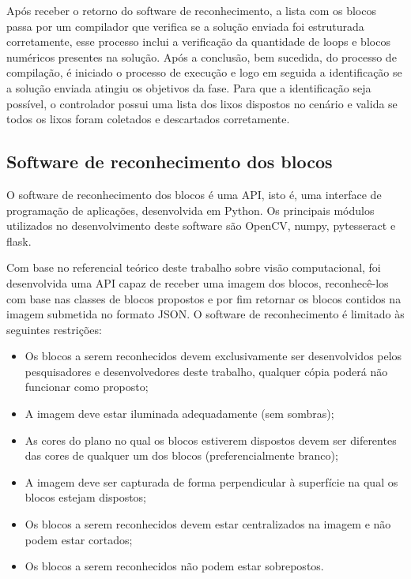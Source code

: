     Após receber o retorno do software de reconhecimento, a lista com os blocos passa por um compilador que verifica se a solução enviada foi estruturada corretamente, esse processo inclui a verificação da quantidade de loops e blocos numéricos presentes na solução. Após a conclusão, bem sucedida, do processo de compilação, é iniciado o processo de execução e logo em seguida a identificação se a solução enviada atingiu os objetivos da fase. Para que a identificação seja possível, o controlador possui uma lista dos lixos dispostos no cenário e valida se todos os lixos foram coletados e descartados corretamente.
    
    
    \subsection{Software de reconhecimento dos blocos}
    
    O software de reconhecimento dos blocos é uma API, isto é, uma interface de programação de aplicações,  desenvolvida em Python. Os principais módulos utilizados no desenvolvimento deste software são OpenCV, numpy, pytesseract e flask.

    Com base no referencial teórico deste trabalho sobre visão computacional, foi desenvolvida uma API capaz de receber uma imagem dos blocos, reconhecê-los com base nas classes de blocos propostos e por fim retornar os blocos contidos na imagem submetida no formato JSON. O software de reconhecimento é limitado às seguintes restrições:
    
        \begin{itemize}
        \item Os blocos a serem reconhecidos devem exclusivamente ser desenvolvidos pelos pesquisadores e desenvolvedores deste trabalho, qualquer cópia poderá não funcionar como proposto;
        \item A imagem deve estar iluminada adequadamente (sem sombras);
        \item As cores do plano no qual os blocos estiverem dispostos devem ser diferentes das cores de qualquer um dos blocos (preferencialmente branco);
        \item A imagem deve ser capturada de forma perpendicular à superfície na qual os blocos estejam dispostos;
       \item Os blocos a serem reconhecidos devem estar centralizados na imagem e não podem estar cortados;
      \item Os blocos a serem reconhecidos não podem estar sobrepostos.
    \end{itemize}

